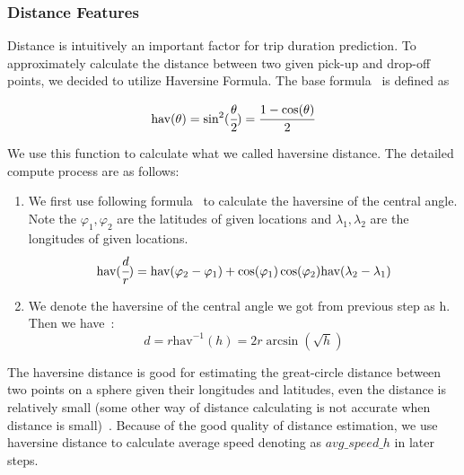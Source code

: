 \subsubsection{Distance Features}
Distance is intuitively an important factor for trip duration prediction. To approximately calculate the distance between two given pick-up and drop-off points, we decided to utilize Haversine Formula. The base formula~\cite{wiki:Haversine_formula} is defined as

\begin{equation}
\text{hav}(\theta) = \sin^2(\cfrac{\theta}{2}) = \cfrac{1-\cos(\theta)}{2}
\end{equation}

We use this function to calculate what we called haversine distance. The detailed compute process are as follows: 
\begin{enumerate}
	\item We first use following formula~\cite{wiki:Haversine_formula} to calculate the haversine of the central angle. Note the $\varphi_1, \varphi_2$  are the latitudes of given locations and $\lambda_1, \lambda_2$ are the longitudes of given locations. 
	\begin{equation}
	\text{hav}(\cfrac{d}{r}) = \text{hav}(\varphi_2 - \varphi_1) + \cos(\varphi_1) \cos(\varphi_2) \text{hav}(\lambda_2 - \lambda_1)
	\end{equation}
	\item We denote the haversine of the central angle we got from previous step as h. Then we have~\cite{wiki:Haversine_formula}:
	\begin{equation}
	d = r \text{hav}^{-1}(h) = 2 r \arcsin(\sqrt{h})
	\end{equation}
\end{enumerate}
The haversine distance is good for estimating the great-circle distance between two points on a sphere given their longitudes and latitudes, even the distance is relatively small (some other way of distance calculating is not accurate when distance is small)~\cite{scripts2013calculate}. Because of the good quality of distance estimation, we use haversine distance to calculate average speed denoting as $avg\_speed\_h$ in later steps.  

